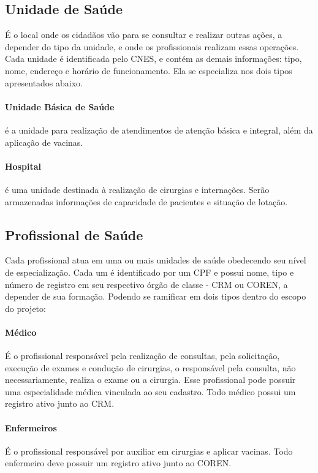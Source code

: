 \documentclass[12pt, a4paper]{article}
\begin{document}
\subsection*{Unidade de Saúde}
    É o local onde os cidadãos vão para se consultar e realizar outras ações, a
    depender do tipo da unidade, e onde os profissionais realizam essas operações. Cada
    unidade é identificada pelo CNES, e contém as demais informações: tipo, nome, endereço
    e horário de funcionamento. Ela se especializa nos dois tipos apresentados abaixo.

\paragraph{Unidade Básica de Saúde} 
    é a unidade para realização de atendimentos de
    atenção básica e integral, além da aplicação de vacinas.

\paragraph{Hospital} 
    é uma unidade destinada à realização de cirurgias e internações. Serão
    armazenadas informações de capacidade de pacientes e situação de
    lotação.

\subsection*{Profissional de Saúde}
    Cada profissional atua em uma ou mais unidades de saúde obedecendo seu nível
    de especialização. Cada um é identificado por um CPF e possui nome, tipo e número de
    registro em seu respectivo órgão de classe - CRM ou COREN, a depender de sua
    formação. Podendo se ramificar em dois tipos dentro do escopo do projeto:

\paragraph{Médico}
    É o profissional responsável pela realização de consultas, pela
    solicitação, execução de exames e condução de cirurgias, o responsável
    pela consulta, não necessariamente, realiza o exame ou a cirurgia. Esse
    profissional pode possuir uma especialidade médica vinculada ao seu
    cadastro. Todo médico possui um registro ativo junto ao CRM.

\paragraph{Enfermeiros} 
    É o profissional responsável por auxiliar em cirurgias e aplicar
    vacinas. Todo enfermeiro deve possuir um registro ativo junto ao COREN.
\end{document}
